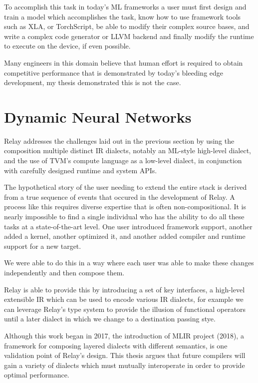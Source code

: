 To accomplish this task in today’s ML frameworks a user must first design and train a model which accomplishes the task, know how to use framework tools such as XLA, or TorchScript, be able to modify their complex source bases, and write a complex code generator or LLVM backend and finally modify the runtime to execute on the device, if even possible.

Many engineers in this domain believe that human effort is required to obtain competitive performance that is demonstrated by today’s bleeding edge development, my thesis demonstrated this is not the case.

\section{Dynamic Neural Networks}

Relay addresses the challenges laid out in the previous section by using the composition multiple distinct IR dialects, notably an ML-style high-level dialect, and the use of TVM’s compute language as a low-level dialect, in conjunction with carefully designed runtime and system APIs.

The hypothetical story of the user needing to extend the entire stack is derived from a true sequence of events that occured in the development of Relay. A process like this requires diverse expertise that is often non-compositional. It is nearly impossible to find a single individual who has the ability to do all these tasks at a state-of-the-art level.  One user introduced framework support, another added a kernel, another optimized it, and another added compiler and runtime support for a new target.

We were able to do this in a way where each user was able to make these changes independently and then compose them.

Relay is able to provide this by introducing a set of key interfaces, a high-level extensible IR which can be used to encode various IR dialects, for example we can leverage Relay’s type system to provide the illusion of functional operators until a later dialect in which we change to a destination passing stye.

Although this work began in 2017, the introduction of MLIR project (2018), a framework for composing layered dialects with different semantics, is one validation point of Relay’s design. This thesis argues that future compilers will gain a variety of dialects which must mutually interoperate in order to provide optimal performance.

